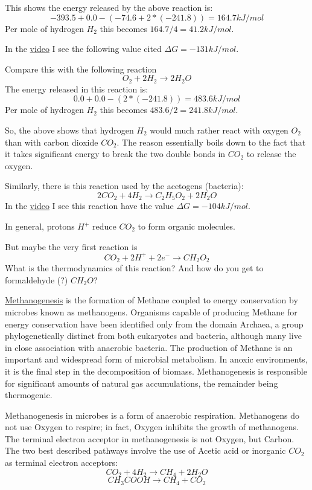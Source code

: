 \documentclass[a4paper,14pt]{extarticle}
\begin{document}
This shows the energy released by the above reaction is:
\[
    -393.5 + 0.0 - (-74.6 + 2*(-241.8)) = 164.7 kJ/mol
\]
Per mole of hydrogen $H_2$ this becomes $164.7/4 = 41.2 kJ/mol$.

In the \href{https://www.youtube.com/watch?v=FWVAyAnrhXU}{video} I see the following value
cited $\Delta G = -131 kJ/mol$.

Compare this with the following reaction
\[
    O_2 + 2H_2 \rightarrow 2H_2O
\]
The energy released in this reaction is:
\[
    0.0 + 0.0 - (2*(-241.8)) = 483.6 kJ/mol
\]
Per mole of hydrogen $H_2$ this becomes $483.6/2 = 241.8 kJ/mol$.

So, the above shows that hydrogen $H_2$ would much rather react with oxygen $O_2$ than
with carbon dioxide $CO_2$. The reason essentially boils down to the fact that it takes
significant energy to break the two double bonds in $CO_2$ to release the oxygen.

Similarly, there is this reaction used by the acetogens (bacteria):
\[
    2CO_2 + 4H_2 \rightarrow C_2H_5O_2 + 2H_2O
\]
In the \href{https://www.youtube.com/watch?v=FWVAyAnrhXU}{video} I see this reaction have
the value $\Delta G = -104 kJ/mol$.

In general, protons $H^+$ reduce $CO_2$ to form organic molecules.

But maybe the very first reaction is
\[
    CO_2 + 2H^+ + 2e^- \rightarrow CH_2O_2
\]
What is the thermodynamics of this reaction?
And how do you get to formaldehyde (?) $CH_2O$?

\href{https://en.wikipedia.org/wiki/Methanogenesis}{Methanogenesis}
is the formation of Methane coupled to energy conservation by microbes known as
methanogens. Organisms capable of producing Methane for energy conservation have been
identified only from the domain Archaea, a group phylogenetically distinct from both
eukaryotes and bacteria, although many live in close association with anaerobic bacteria.
The production of Methane is an important and widespread form of microbial metabolism. In
anoxic environments, it is the final step in the decomposition of biomass. Methanogenesis
is responsible for significant amounts of natural gas accumulations, the remainder being
thermogenic.

Methanogenesis in microbes is a form of anaerobic respiration. Methanogens do not use
Oxygen to respire; in fact, Oxygen inhibits the growth of methanogens. The terminal
electron acceptor in methanogenesis is not Oxygen, but Carbon. The two best described
pathways involve the use of Acetic acid or inorganic $CO_2$ as terminal electron
acceptors:
\[
    CO_2 + 4 H_2 \rightarrow CH_4 + 2 H_2O
\]
\[
    CH_3COOH \rightarrow CH_4 + CO_2
\]
\end{document}
